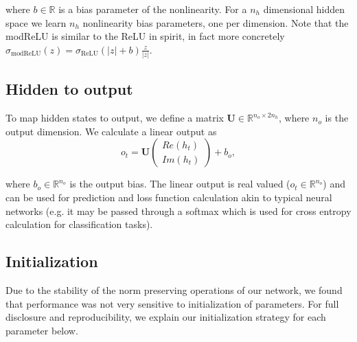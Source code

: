 \documentclass{article} %
\newcommand{\matr}[1]{\mathbf{#1}}
\newcommand\RR{\mathbb{R}}
\begin{document}
where $b \in \RR$ is a bias parameter of the nonlinearity. For a $n_h$ dimensional hidden space
we learn $n_h$ nonlinearity bias parameters, one per dimension. 
Note that the modReLU is similar to the ReLU in spirit, in fact more concretely
$\sigma_\mathrm{modReLU}(z) = \sigma_\mathrm{ReLU}(|z| + b) \frac{z}{|z|}$. 

\subsection{Hidden to output}

To map hidden states to output, we define a matrix $\matr{U} \in \RR^{n_o \times 2n_h}$, 
where $n_o$ is the output dimension. We calculate a linear output as
\begin{equation} o_t = \matr{U} \begin{pmatrix} Re(h_t) \\ Im(h_t) \end{pmatrix} + b_o , \end{equation}

where $b_o \in \RR^{n_o}$ is the output bias. 
The linear output is real valued ($o_t \in \RR^{n_o}$) and can be used for prediction and loss function 
calculation akin to typical neural networks (e.g. it may be passed through a softmax which is used for 
cross entropy calculation for classification tasks).


\subsection{Initialization}

Due to the stability of the norm preserving operations of our network, we found that performance was
not very sensitive to initialization of parameters.
For full disclosure and reproducibility, we explain our initialization strategy for each parameter below.
\end{document}
